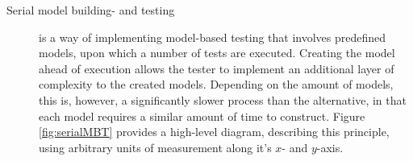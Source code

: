 \begin{description}
	\item[Serial model building- and testing]
	is a way of implementing model-based testing that involves predefined models, upon which a number of tests are executed. Creating the model ahead of execution allows the tester to implement an additional layer of complexity to the created models. Depending on the amount of models, this is, however, a significantly slower process than the alternative, in that each model requires a similar amount of time to construct. Figure \ref{fig:serialMBT} provides a high-level diagram, describing this principle, using arbitrary units of measurement along it's $x$- and $y$-axis.\\
	\begin{figure}
		\centering
\end{figure}
\end{description}
